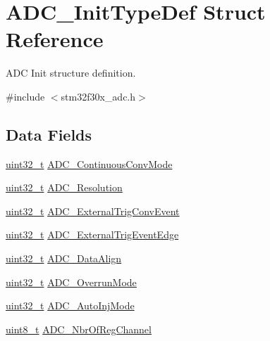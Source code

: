 \hypertarget{struct_a_d_c___init_type_def}{\section{A\-D\-C\-\_\-\-Init\-Type\-Def Struct Reference}
\label{struct_a_d_c___init_type_def}
}


A\-D\-C Init structure definition.  




{\ttfamily \#include $<$stm32f30x\-\_\-adc.\-h$>$}

\subsection*{Data Fields}
\begin{DoxyCompactItemize}
\item 
\hyperlink{stdint_8h_a435d1572bf3f880d55459d9805097f62}{uint32\-\_\-t} \hyperlink{struct_a_d_c___init_type_def_a52e3f0d75cb726843c4db4512d42824c}{A\-D\-C\-\_\-\-Continuous\-Conv\-Mode}
\item 
\hyperlink{stdint_8h_a435d1572bf3f880d55459d9805097f62}{uint32\-\_\-t} \hyperlink{struct_a_d_c___init_type_def_a275d9553bbe17a60d618b619678b7c94}{A\-D\-C\-\_\-\-Resolution}
\item 
\hyperlink{stdint_8h_a435d1572bf3f880d55459d9805097f62}{uint32\-\_\-t} \hyperlink{struct_a_d_c___init_type_def_aeb8674fbc45876945d027fde24067d84}{A\-D\-C\-\_\-\-External\-Trig\-Conv\-Event}
\item 
\hyperlink{stdint_8h_a435d1572bf3f880d55459d9805097f62}{uint32\-\_\-t} \hyperlink{struct_a_d_c___init_type_def_adb84bdccfdfca06e30d1acc4e242017e}{A\-D\-C\-\_\-\-External\-Trig\-Event\-Edge}
\item 
\hyperlink{stdint_8h_a435d1572bf3f880d55459d9805097f62}{uint32\-\_\-t} \hyperlink{struct_a_d_c___init_type_def_a622e89d8fba3900f20aaf40d5560ab7b}{A\-D\-C\-\_\-\-Data\-Align}
\item 
\hyperlink{stdint_8h_a435d1572bf3f880d55459d9805097f62}{uint32\-\_\-t} \hyperlink{struct_a_d_c___init_type_def_af5d17b08dccd56f83b340a594379f4aa}{A\-D\-C\-\_\-\-Overrun\-Mode}
\item 
\hyperlink{stdint_8h_a435d1572bf3f880d55459d9805097f62}{uint32\-\_\-t} \hyperlink{struct_a_d_c___init_type_def_a43be794a25a10b9ff810ac0ac2b0a7df}{A\-D\-C\-\_\-\-Auto\-Inj\-Mode}
\item 
\hyperlink{stdint_8h_aba7bc1797add20fe3efdf37ced1182c5}{uint8\-\_\-t} \hyperlink{struct_a_d_c___init_type_def_a94112eb5105aba4a2346f50c41942bd9}{A\-D\-C\-\_\-\-Nbr\-Of\-Reg\-Channel}
\end{DoxyCompactItemize}



